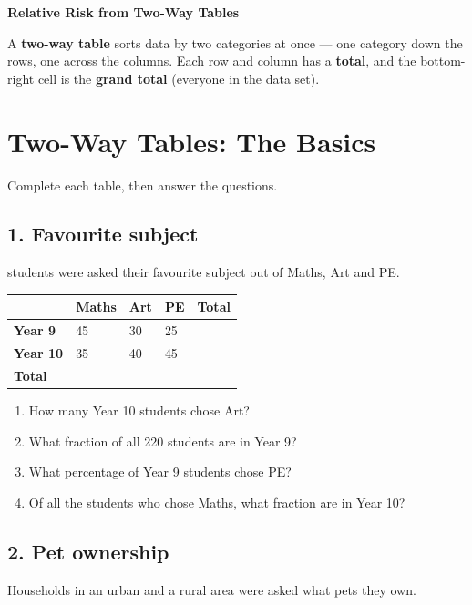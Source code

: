 \documentclass[11pt]{article}
\newcommand{\ans}{\hrulefill}
\begin{document}
\begin{center}
  {\Large\bfseries Relative Risk from Two-Way Tables}
\end{center}

\vspace{0.3em}
\noindent A \textbf{two-way table} sorts data by two categories at once --- one category down the rows, one across the columns. Each row and column has a \textbf{total}, and the bottom-right cell is the \textbf{grand total} (everyone in the data set).

\vspace{0.5em}
\section{Two-Way Tables: The Basics}
\noindent Complete each table, then answer the questions.

\subsection*{1. Favourite subject}
 students were asked their favourite subject out of Maths, Art and PE.

\begin{center}
\begin{tabular}{|L|Y|Y|Y|Y|}
\hline
 & Maths & Art & PE & \textbf{Total} \\\hline
\textbf{Year 9}  & 45 & 30 & 25 & \\\hline
\textbf{Year 10} & 35 & 40 & 45 & \\\hline
\textbf{Total}   &    &    &    & \\\hline
\end{tabular}
\end{center}

\begin{enumerate}
  \item How many Year 10 students chose Art? \ans
  \item What fraction of all 220 students are in Year 9? \ans
  \item What percentage of Year 9 students chose PE? \ans
  \item Of all the students who chose Maths, what fraction are in Year 10? \ans
\end{enumerate}

\subsection*{2. Pet ownership}
\noindent Households in an urban and a rural area were asked what pets they own.
\end{document}
